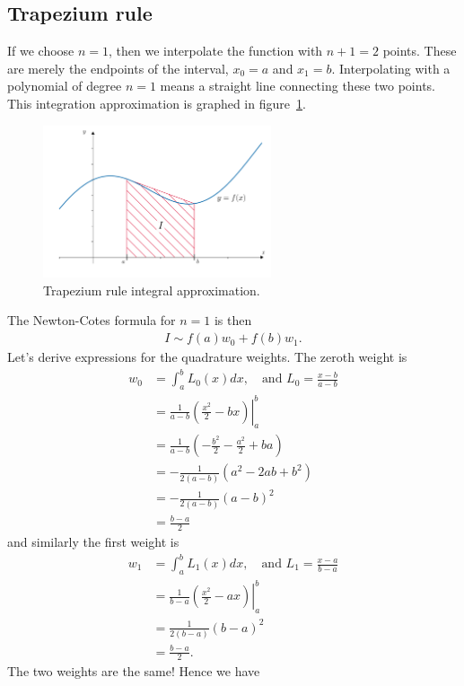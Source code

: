 \subsection{Trapezium rule}
If we choose $n=1$, then we interpolate the function with $n+1=2$ points. These are merely the endpoints of the interval, $x_0=a$ and $x_1=b$. Interpolating with a polynomial of degree $n=1$ means a straight line connecting these two points. This integration approximation is graphed in figure~\ref{fig:ch5_trapezium}.
\begin{figure}[H]
	\begin{center}
	\includegraphics[width=0.6\textwidth]{figures/ch5_trapezium.pdf} 
	  \caption{Trapezium rule integral approximation.} \label{fig:ch5_trapezium}
	\end{center}
\end{figure}
The Newton-Cotes formula for $n=1$ is then
\begin{align*}
I \sim f(a) w_0 + f(b) w_1.
\end{align*}
Let's derive expressions for the quadrature weights. The zeroth weight is
\begin{align*}
w_0 &= \int_a^b L_0(x) dx, \quad \text{and } L_0 = \frac{x-b}{a-b} \\
 &= \frac{1}{a-b} \left. \left(\frac{x^2}{2} - bx \right) \right|_a^b \\
 &= \frac{1}{a-b} \left( -\frac{b^2}{2} - \frac{a^2}{2} + ba \right) \\
 &= -\frac{1}{2(a-b)} \left( a^2 - 2ab + b^2 \right) \\
 &= -\frac{1}{2(a-b)} \left( a - b \right)^2 \\
 &= \frac{b - a}{2}
\end{align*}
and similarly the first weight is
\begin{align*}
w_1 &= \int_a^b L_1(x) dx, \quad \text{and } L_1 = \frac{x-a}{b-a} \\
 &= \frac{1}{b-a} \left. \left(\frac{x^2}{2} - ax \right) \right|_a^b \\
 &= \frac{1}{2(b-a)} \left( b - a \right)^2 \\
 &= \frac{b - a}{2}.
\end{align*}
The two weights are the same! Hence we have  \\

